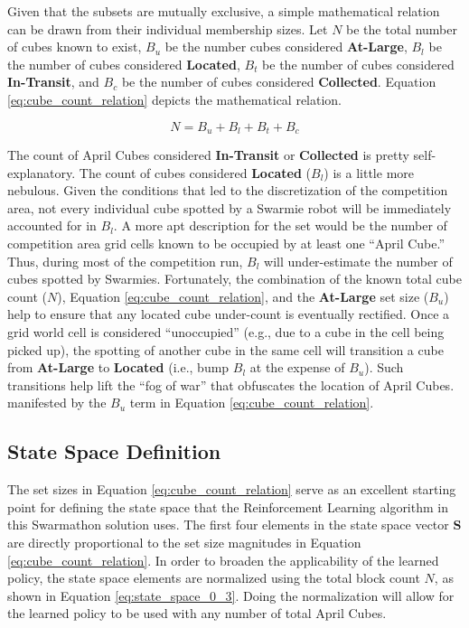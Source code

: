 \documentclass[sigconf,authordraft]{acmart}
\begin{document}
Given that the subsets are mutually exclusive, a simple mathematical relation can be drawn from their individual membership sizes. Let $N$ be the total number of cubes known to exist, $B_u$ be the number cubes considered \textbf{At-Large}, $B_l$ be the number of cubes considered \textbf{Located}, $B_t$ be the number of cubes considered \textbf{In-Transit}, and $B_c$ be the number of cubes considered \textbf{Collected}. Equation \ref{eq:cube_count_relation} depicts the mathematical relation.

\begin{equation}\label{eq:cube_count_relation}
  N = B_u + B_l + B_t + B_c
\end{equation}

The count of April Cubes considered \textbf{In-Transit} or \textbf{Collected} is pretty self-explanatory. The count of cubes considered \textbf{Located} ($B_l$) is a little more nebulous. Given the conditions that led to the discretization of the competition area, not every individual cube spotted by a Swarmie robot will be immediately accounted for in $B_l$. A more apt description for the set would be the number of competition area grid cells known to be occupied by at least one ``April Cube.'' Thus, during most of the competition run, $B_l$ will under-estimate the number of cubes spotted by Swarmies. Fortunately, the combination of the known total cube count ($N$), Equation \ref{eq:cube_count_relation}, and the \textbf{At-Large} set size ($B_u$) help to ensure that any located cube under-count is eventually rectified. Once a grid world cell is considered ``unoccupied'' (e.g., due to a cube in the cell being picked up), the spotting of another cube in the same cell will transition a cube from \textbf{At-Large} to \textbf{Located} (i.e., bump $B_l$ at the expense of $B_u$). Such transitions help lift the ``fog of war'' that obfuscates the location of April Cubes. manifested by the $B_u$ term in Equation \ref{eq:cube_count_relation}.

\subsection{State Space Definition}\label{subsec:state_space}
The set sizes in Equation \ref{eq:cube_count_relation} serve as an excellent starting point for defining the state space that the Reinforcement Learning algorithm in this Swarmathon solution uses. The first four elements in the state space vector \textbf{S} are directly proportional to the set size magnitudes in Equation \ref{eq:cube_count_relation}. In order to broaden the applicability of the learned policy, the state space elements are normalized using the total block count $N$, as shown in Equation \ref{eq:state_space_0_3}. Doing the normalization will allow for the learned policy to be used with any number of total April Cubes.
\end{document}
